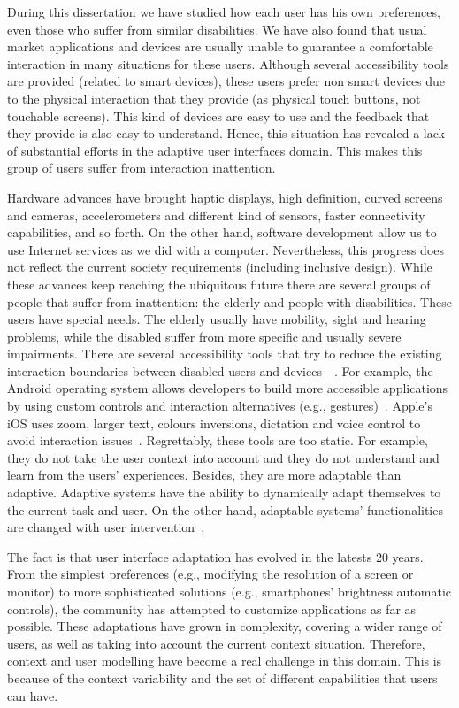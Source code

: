 During this dissertation we have studied how each user has his own preferences,
even those who suffer from similar disabilities. We have also found that usual 
market applications and devices are usually unable to guarantee a comfortable 
interaction in many situations for these users. Although several accessibility 
tools are provided (related to smart devices), these users prefer non smart 
devices due to the physical interaction that they provide (as physical touch 
buttons, not touchable screens). This kind of devices are easy to use and the 
feedback that they provide is also easy to understand. Hence, this situation has
revealed a lack of substantial efforts in the adaptive user interfaces domain. 
This makes this group of users suffer from interaction inattention.

Hardware advances have brought haptic displays, high definition, curved 
screens and cameras, accelerometers and different kind of sensors, faster 
connectivity capabilities, and so forth. On the other hand, software development
allow us to use Internet services as we did with a computer. Nevertheless,
this progress does not reflect the current society requirements (including
inclusive design). While these advances keep reaching the ubiquitous future
there are several groups of people that suffer from inattention: the elderly and
people with disabilities. These users have special needs. The elderly usually
have mobility, sight and hearing problems, while the disabled suffer from more
specific and usually severe impairments. There are several accessibility tools
that try to reduce the existing interaction boundaries between disabled users
and devices~\citep{gregor_designing_2002}~\citep{burgstahler_designing_2002}.
For example, the Android operating system allows developers to build more accessible 
applications by using custom controls and interaction alternatives (e.g.,
gestures)~\citep{android_accessibility}. Apple's iOS uses zoom, larger text,
colours inversions, dictation and voice control to avoid interaction
issues~\citep{ios_accessibility}. Regrettably, these tools are too static. For
example, they do not take the user context into account and they do not understand
and learn from the users' experiences. Besides, they are more adaptable than 
adaptive. Adaptive systems have the ability to dynamically adapt themselves to 
the current task and user. On the other hand, adaptable systems' functionalities 
are changed with user intervention~\citep{fischer_user_2001}.

The fact is that user interface adaptation has evolved in the latests 20 years.
From the simplest preferences (e.g., modifying the resolution of a screen or
monitor) to more sophisticated solutions (e.g., smartphones' brightness automatic
controls), the community has attempted to customize applications as far as 
possible. These adaptations have grown in complexity, covering a wider range of 
users, as well as taking into account the current context situation. Therefore, 
context and user modelling have become a real challenge in this domain. This is 
because of the context variability and the set of different capabilities that 
users can have.

